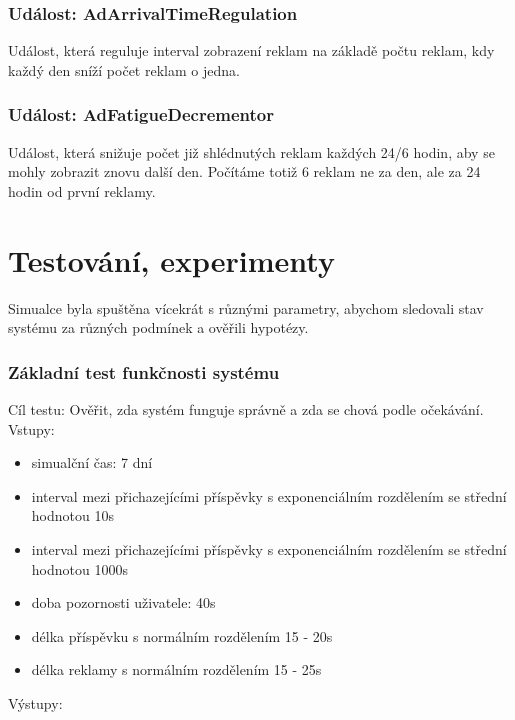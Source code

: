 \documentclass[11pt, a4paper]{article}
\begin{document}
\subsubsection{Událost: AdArrivalTimeRegulation}
Událost, která reguluje interval zobrazení reklam na základě počtu reklam, kdy každý den sníží počet reklam o jedna.
\subsubsection{Událost: AdFatigueDecrementor}
Událost, která snižuje počet již shlédnutých reklam každých 24/6 hodin, aby se mohly zobrazit znovu další den. Počítáme totiž 6 reklam ne za den, ale za 24 hodin od první reklamy.


\section{Testování, experimenty}
Simualce byla spuštěna vícekrát s různými parametry, abychom sledovali stav systému za různých podmínek a ověřili hypotézy.

\subsubsection{Základní test funkčnosti systému}
Cíl testu: Ověřit, zda systém funguje správně a zda se chová podle očekávání.
Vstupy:
\begin{itemize}
    \item simualční čas: 7 dní
    \item interval mezi přichazejícími příspěvky s exponenciálním rozdělením se střední hodnotou 10s
    \item interval mezi přichazejícími příspěvky s exponenciálním rozdělením se střední hodnotou 1000s
    \item doba pozornosti uživatele: 40s
    \item délka příspěvku s normálním rozdělením 15 - 20s
    \item délka reklamy s normálním rozdělením 15 - 25s
\end{itemize}
Výstupy:
\end{document}
